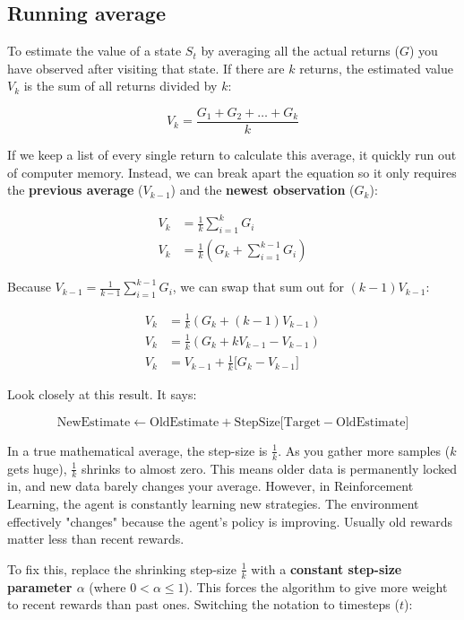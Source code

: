 \documentclass{article}
\begin{document}
\subsection{Running average}

To estimate the value of a state $S_t$ by averaging all the actual returns ($G$) you have observed after visiting that state. 
If there are $k$ returns, the estimated value $V_k$ is the sum of all returns divided by $k$:

\[
V_k = \frac{G_1 + G_2 + \dots + G_k}{k}
\]

If we keep a list of every single return to calculate this average, it quickly run out of computer memory. 
Instead, we can break apart the equation so it only requires the \textbf{previous average} ($V_{k-1}$) and the \textbf{newest observation} ($G_k$):

\begin{align*}
V_k &= \frac{1}{k} \sum_{i=1}^k G_i \\
V_k &= \frac{1}{k} \left( G_k + \sum_{i=1}^{k-1} G_i \right)
\end{align*}

Because $V_{k-1} = \frac{1}{k-1} \sum_{i=1}^{k-1} G_i$, we can swap that sum out for $(k-1)V_{k-1}$:

\begin{align*}
V_k &= \frac{1}{k} \left( G_k + (k-1)V_{k-1} \right) \\
V_k &= \frac{1}{k} \left( G_k + kV_{k-1} - V_{k-1} \right) \\
V_k &= V_{k-1} + \frac{1}{k} \big[ G_k - V_{k-1} \big]
\end{align*}

Look closely at this result. It says:

\[
\text{NewEstimate} \leftarrow \text{OldEstimate} + \text{StepSize} \big[ \text{Target} - \text{OldEstimate} \big]
\]

In a true mathematical average, the step-size is $\frac{1}{k}$. As you gather more samples ($k$ gets huge), 
$\frac{1}{k}$ shrinks to almost zero. This means older data is permanently locked in, and new data barely changes your average.
However, in Reinforcement Learning, the agent is constantly learning new strategies. The environment effectively "changes" 
because the agent's policy is improving. Usually old rewards matter less than recent rewards.

To fix this, replace the shrinking step-size $\frac{1}{k}$ with a \textbf{constant step-size parameter $\alpha$} (where $0 < \alpha \le 1$). 
This forces the algorithm to give more weight to recent rewards than past ones. Switching the notation to timesteps ($t$):
\end{document}
